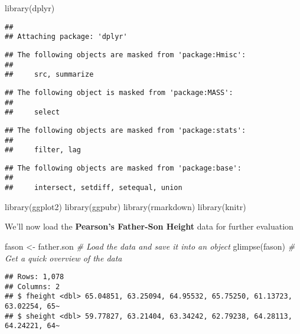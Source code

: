 \documentclass[
]{article}
\newenvironment{Shaded}{\begin{snugshade}}{\end{snugshade}}
\newcommand{\CommentTok}[1]{\textcolor[rgb]{0.56,0.35,0.01}{\textit{#1}}}
\newcommand{\FunctionTok}[1]{\textcolor[rgb]{0.00,0.00,0.00}{#1}}
\newcommand{\NormalTok}[1]{#1}
\newcommand{\OtherTok}[1]{\textcolor[rgb]{0.56,0.35,0.01}{#1}}
\begin{document}
\begin{Shaded}
\begin{Highlighting}[]
\FunctionTok{library}\NormalTok{(dplyr)}
\end{Highlighting}
\end{Shaded}

\begin{verbatim}
## 
## Attaching package: 'dplyr'
\end{verbatim}

\begin{verbatim}
## The following objects are masked from 'package:Hmisc':
## 
##     src, summarize
\end{verbatim}

\begin{verbatim}
## The following object is masked from 'package:MASS':
## 
##     select
\end{verbatim}

\begin{verbatim}
## The following objects are masked from 'package:stats':
## 
##     filter, lag
\end{verbatim}

\begin{verbatim}
## The following objects are masked from 'package:base':
## 
##     intersect, setdiff, setequal, union
\end{verbatim}

\begin{Shaded}
\begin{Highlighting}[]
\FunctionTok{library}\NormalTok{(ggplot2)}
\FunctionTok{library}\NormalTok{(ggpubr)}
\FunctionTok{library}\NormalTok{(rmarkdown)}
\FunctionTok{library}\NormalTok{(knitr)}
\end{Highlighting}
\end{Shaded}

We'll now load the \textbf{Pearson's Father-Son Height} data for further
evaluation

\begin{Shaded}
\begin{Highlighting}[]
\NormalTok{fason }\OtherTok{\textless{}{-}}\NormalTok{ father.son }\CommentTok{\# Load the data and save it into an object}
\FunctionTok{glimpse}\NormalTok{(fason) }\CommentTok{\# Get a quick overview of the data}
\end{Highlighting}
\end{Shaded}

\begin{verbatim}
## Rows: 1,078
## Columns: 2
## $ fheight <dbl> 65.04851, 63.25094, 64.95532, 65.75250, 61.13723, 63.02254, 65~
## $ sheight <dbl> 59.77827, 63.21404, 63.34242, 62.79238, 64.28113, 64.24221, 64~
\end{verbatim}
\end{document}
